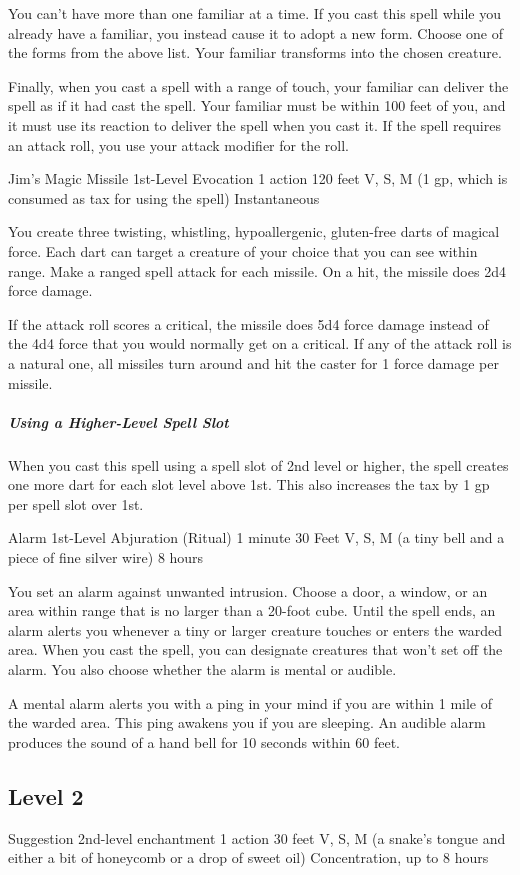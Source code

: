 \documentclass[letterpaper,openany,oneside,twocolumn]{book}
\begin{document}
You can’t have more than one familiar at a time. If you cast this spell while you already have a familiar, you instead cause it to adopt a new form. Choose one of the forms from the above list. Your familiar transforms into the chosen creature.

Finally, when you cast a spell with a range of touch, your familiar can deliver the spell as if it had cast the spell. Your familiar must be within 100 feet of you, and it must use its reaction to deliver the spell when you cast it. If the spell requires an attack roll, you use your attack modifier for the roll.

\DndSpellHeader
  {Jim's Magic Missile}
  {1st-Level Evocation }
  {1 action}
  {120 feet}
  {V, S, M (1 gp, which is consumed as tax for using the spell)}
  {Instantaneous}

You create three twisting, whistling, hypoallergenic, gluten-free darts of magical force. Each dart can target a creature of your choice that you can see within range. Make a ranged spell attack for each missile. On a hit, the missile does 2d4 force damage.

If the attack roll scores a critical, the missile does 5d4 force damage instead of the 4d4 force that you would normally get on a critical. If any of the attack roll is a natural one, all missiles turn around and hit the caster for 1 force damage per missile.

\subparagraph*{Using a Higher-Level Spell Slot} When you cast this spell using a spell slot of 2nd level or higher, the spell creates one more dart for each slot level above 1st. This also increases the tax by 1 gp per spell slot over 1st.

\DndSpellHeader
  {Alarm}
  {1st-Level Abjuration (Ritual)}
  {1 minute}
  {30 Feet}
  {V, S, M (a tiny bell and a piece of fine silver wire)}
  {8 hours}

You set an alarm against unwanted intrusion. Choose a door, a window, or an area within range that is no larger than a 20-foot cube. Until the spell ends, an alarm alerts you whenever a tiny or larger creature touches or enters the warded area. When you cast the spell, you can designate creatures that won’t set off the alarm. You also choose whether the alarm is mental or audible.

A mental alarm alerts you with a ping in your mind if you are within 1 mile of the warded area. This ping awakens you if you are sleeping. An audible alarm produces the sound of a hand bell for 10 seconds within 60 feet.
\subsection*{Level 2}
\DndSpellHeader
  {Suggestion}
  {2nd-level enchantment }
  {1 action}
  {30 feet}
  {V, S, M (a snake’s tongue and either a bit of honeycomb or a drop of sweet oil)}
  {Concentration, up to 8 hours}
\end{document}
